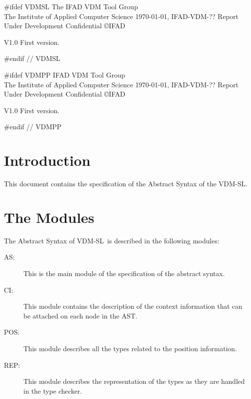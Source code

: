 \documentclass[a4paper,dvips]{article}
\newcommand{\VDMSLPP}{VDM-SL}
\newcommand{\VDMSLPP}{VDM++}
\begin{document}

#ifdef VDMSL
{ The IFAD VDM Tool Group \\
  The Institute of Applied Computer Science}
{\today,}
{IFAD-VDM-??}
{Report}
{Under Development}
{Confidential}
{}
{\copyright IFAD}
{\item[V1.0] First version.
}
{}
#endif // VDMSL

#ifdef VDMPP
       {IFAD VDM Tool Group \\
       The Institute of Applied Computer Science}
       {\today,}
       {IFAD-VDM-??}
       {Report}
       {Under Development}
       {Confidential}
       {}
       {\copyright IFAD}
       {\item[V1.0] First version.}
       {}
#endif // VDMPP
\renewcommand{\thepage}{\roman{page}}

\tableofcontents
\newpage
\renewcommand{\thepage}{\arabic{page}}
\setcounter{page}{1}

\parskip12pt
\parindent0pt

\section{Introduction}

This document contains the specification of the Abstract Syntax of the
\VDMSLPP.

\section{The Modules}

The Abstract Syntax of \VDMSLPP\ is described in the following
modules:

\begin{description}
\item[AS:] This is the main module of the specification of the
  abstract syntax. 
\item[CI:] This module contains the description of the context
  information that can be attached on each node in the AST.
\item[POS:] This module describes all the types related to the position
  information.
\item[REP:] This module describes the representation of the types as
  they are handled in the type checker.
\end{description}
\end{document}
